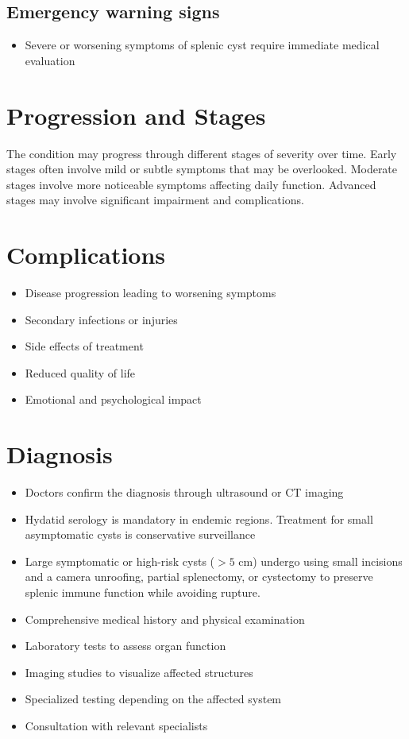 \subsection{Emergency warning signs}
\begin{itemize}[noitemsep]
  \item Severe or worsening symptoms of splenic cyst require immediate medical evaluation
\end{itemize}
\section{Progression and Stages}
The condition may progress through different stages of severity over time. Early stages often involve mild or subtle symptoms that may be overlooked. Moderate stages involve more noticeable symptoms affecting daily function. Advanced stages may involve significant impairment and complications.
\section{Complications}
\begin{itemize}[noitemsep]
  \item Disease progression leading to worsening symptoms
  \item Secondary infections or injuries
  \item Side effects of treatment
  \item Reduced quality of life
  \item Emotional and psychological impact
\end{itemize}
\section{Diagnosis}
\begin{itemize}[noitemsep]
  \item Doctors confirm the diagnosis through ultrasound or CT imaging
  \item Hydatid serology is mandatory in endemic regions. Treatment for small asymptomatic cysts is conservative surveillance
  \item Large symptomatic or high-risk cysts ($>5$ cm) undergo using small incisions and a camera unroofing, partial splenectomy, or cystectomy to preserve splenic immune function while avoiding rupture.
  \item Comprehensive medical history and physical examination
  \item Laboratory tests to assess organ function
  \item Imaging studies to visualize affected structures
  \item Specialized testing depending on the affected system
  \item Consultation with relevant specialists
\end{itemize}
